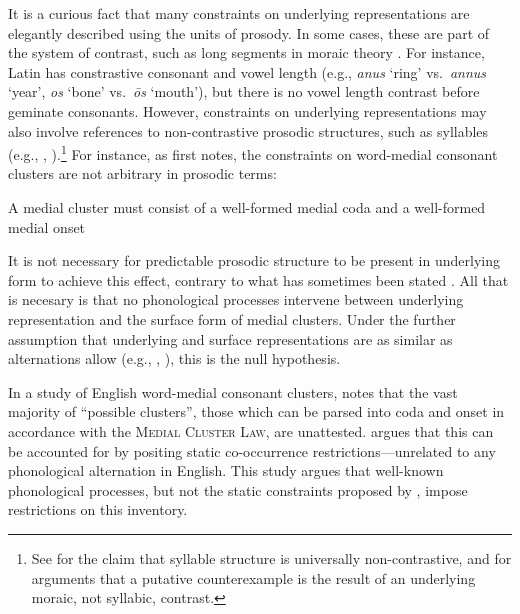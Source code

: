 \label{gaps} 

It is a curious fact that many constraints on underlying representations are elegantly described using the units of prosody.
In some cases, these are part of the system of contrast, such as long segments in moraic theory \citep[e.g.,][]{Davis1999}. For instance, Latin has constrastive consonant and vowel length (e.g., \emph{anus} `ring' vs.~\emph{annus} `year', \emph{os} `bone' vs.~\emph{ōs} `mouth'), but there is no vowel length contrast before geminate consonants. However, constraints on underlying representations may also involve references to non-contrastive prosodic structures, such as syllables (e.g., \citealt{Hooper1973}, \citealt{Kahn1976}).\footnote{See \citealt{Blevins1995} for the claim that syllable structure is universally non-contrastive, and \citealt{Elfner2006} for arguments that a putative counterexample is the result of an underlying moraic, not syllabic, contrast.}
For instance, as \citeauthor{Haugen1956} first notes, the constraints on word-medial consonant clusters are not arbitrary in prosodic terms:

\begin{example}
\label{mcl}
A medial cluster must consist of a well-formed medial coda and a well-formed medial onset
\end{example}

\noindent
It is not necessary for predictable prosodic structure to be present in underlying form to achieve this effect, contrary to what has sometimes been stated \citep[e.g.,][255]{A74}.
All that is necesary is that no phonological processes intervene between underlying representation and the surface form of medial clusters.
Under the further assumption that underlying and surface representations are as similar as alternations allow (e.g., \citealt[205f.]{Dell1973}, \citealt[28f.]{Stampe1973}), this is the null hypothesis. 

In a study of English word-medial consonant clusters, \citet{Pierrehumbert1994} notes that the vast majority of ``possible clusters'', those which can be parsed into coda and onset in accordance with the \textsc{Medial Cluster Law}, are unattested.
\citeauthor{Pierrehumbert1994} argues that this can be accounted for by positing static co-occurrence restrictions---unrelated to any phonological alternation in English.
This study argues that well-known phonological processes, but not the static constraints proposed by \citeauthor{Pierrehumbert1994}, impose restrictions on this inventory.

